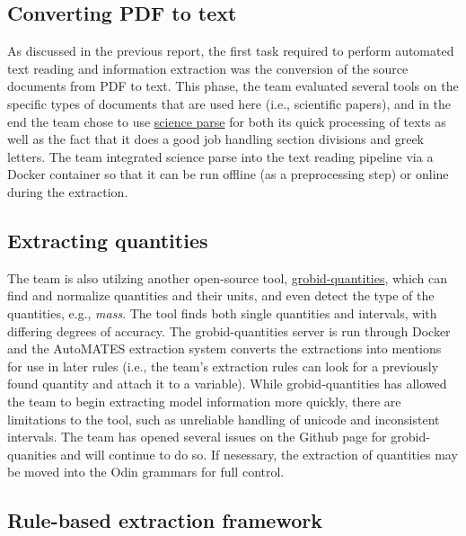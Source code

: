 \documentclass[article, 12pt, oneside]{memoir}
\begin{document}
\hypertarget{converting-pdf-to-text}{%
\subsection{Converting PDF to text}\label{converting-pdf-to-text}}

As discussed in the previous report, the first task required to perform
automated text reading and information extraction was the conversion of
the source documents from PDF to text. This phase, the team evaluated
several tools on the specific types of documents that are used here
(i.e., scientific papers), and in the end the team chose to use
\href{https://github.com/allenai/science-parse}{science parse} for both
its quick processing of texts as well as the fact that it does a good
job handling section divisions and greek letters. The team integrated
science parse into the text reading pipeline via a Docker container so
that it can be run offline (as a preprocessing step) or online during
the extraction.

\hypertarget{extracting-quantities}{%
\subsection{Extracting quantities}\label{extracting-quantities}}

The team is also utilzing another open-source tool,
\href{https://github.com/kermitt2/grobid-quantities}{grobid-quantities},
which can find and normalize quantities and their units, and even detect
the type of the quantities, e.g., \emph{mass}. The tool finds both
single quantities and intervals, with differing degrees of accuracy. The
grobid-quantities server is run through Docker and the AutoMATES
extraction system converts the extractions into mentions for use in
later rules (i.e., the team's extraction rules can look for a previously
found quantity and attach it to a variable). While grobid-quantities has
allowed the team to begin extracting model information more quickly,
there are limitations to the tool, such as unreliable handling of
unicode and inconsistent intervals. The team has opened several issues
on the Github page for grobid-quanities and will continue to do so. If
nesessary, the extraction of quantities may be moved into the Odin
grammars for full control.

\hypertarget{rule-based-extraction-framework}{%
\subsection{Rule-based extraction
framework}\label{rule-based-extraction-framework}}
\end{document}
